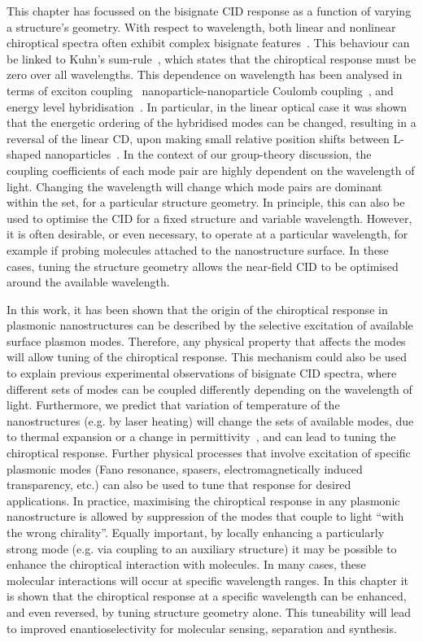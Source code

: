 This chapter has focussed on the bisignate CID response as a function of varying a structure's geometry. With respect to wavelength, both linear and nonlinear chiroptical spectra often exhibit complex bisignate features~\cite{Li2015, Lee2013, Decker2007, Droulias2013, Plum2009}. This behaviour can be linked to Kuhn's sum-rule~\cite{Kuhn1930}, which states that the chiroptical response must be zero over all wavelengths. This dependence on wavelength has been analysed in terms of exciton coupling~\cite{Guerrero-Martinez2011} nanoparticle-nanoparticle Coulomb coupling~\cite{Fan2010}, and energy level hybridisation~\cite{Auguie2011a}.
In particular, in the linear optical case it was shown that the energetic ordering of the hybridised modes can be changed, resulting in a reversal of the linear CD, upon making small relative position shifts between L-shaped nanoparticles~\cite{Hentschel2015}.
In the context of our group-theory discussion, the coupling coefficients of each mode pair are highly dependent on the wavelength of light. Changing the wavelength will change which mode pairs are dominant within the set, for a particular structure geometry. In principle, this can also be used to optimise the CID for a fixed structure and variable wavelength. However, it is often desirable, or even necessary, to operate at a particular wavelength, for example if probing molecules attached to the nanostructure surface. In these cases, tuning the structure geometry allows the near-field CID to be optimised around the available wavelength.

In this work, it has been shown that the origin of the chiroptical response in plasmonic nanostructures can be described by the selective excitation of available surface plasmon modes. Therefore, any physical property that affects the modes will allow tuning of the chiroptical response. This mechanism could also be used to explain previous experimental observations of bisignate CID spectra, where different sets of modes can be coupled differently depending on the wavelength of light. Furthermore, we predict that variation of temperature of the nanostructures (e.g. by laser heating) will change the sets of available modes, due to thermal expansion or a change in permittivity~\cite{Aksyutov1977}, and can lead to tuning the chiroptical response. Further physical processes that involve excitation of specific plasmonic modes (Fano resonance, spasers, electromagnetically induced transparency, etc.) can also be used to tune that response for desired applications. 
In practice, maximising the chiroptical response in any plasmonic nanostructure is allowed by suppression of the modes that couple to light ``with the wrong chirality''. Equally important, by locally enhancing a particularly strong mode (e.g. via coupling to an auxiliary structure) it may be possible to enhance the chiroptical interaction with molecules. In many cases, these molecular interactions will occur at specific wavelength ranges. In this chapter it is shown that the chiroptical response at a specific wavelength can be enhanced, and even reversed, by tuning structure geometry alone. This tuneability will lead to improved enantioselectivity for molecular sensing, separation and synthesis.
